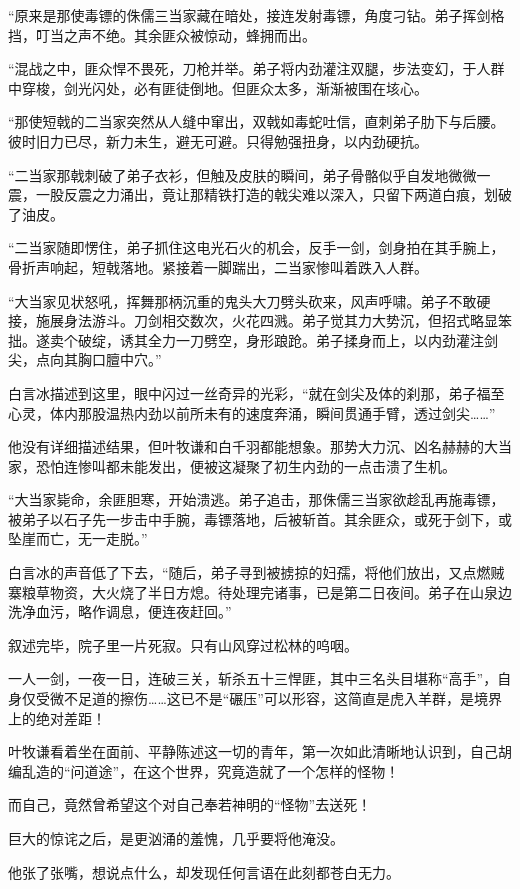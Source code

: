 “原来是那使毒镖的侏儒三当家藏在暗处，接连发射毒镖，角度刁钻。弟子挥剑格挡，叮当之声不绝。其余匪众被惊动，蜂拥而出。

“混战之中，匪众悍不畏死，刀枪并举。弟子将内劲灌注双腿，步法变幻，于人群中穿梭，剑光闪处，必有匪徒倒地。但匪众太多，渐渐被围在垓心。

“那使短戟的二当家突然从人缝中窜出，双戟如毒蛇吐信，直刺弟子肋下与后腰。彼时旧力已尽，新力未生，避无可避。只得勉强扭身，以内劲硬抗。

“二当家那戟刺破了弟子衣衫，但触及皮肤的瞬间，弟子骨骼似乎自发地微微一震，一股反震之力涌出，竟让那精铁打造的戟尖难以深入，只留下两道白痕，划破了油皮。

“二当家随即愣住，弟子抓住这电光石火的机会，反手一剑，剑身拍在其手腕上，骨折声响起，短戟落地。紧接着一脚踹出，二当家惨叫着跌入人群。

“大当家见状怒吼，挥舞那柄沉重的鬼头大刀劈头砍来，风声呼啸。弟子不敢硬接，施展身法游斗。刀剑相交数次，火花四溅。弟子觉其力大势沉，但招式略显笨拙。遂卖个破绽，诱其全力一刀劈空，身形踉跄。弟子揉身而上，以内劲灌注剑尖，点向其胸口膻中穴。”

白言冰描述到这里，眼中闪过一丝奇异的光彩，“就在剑尖及体的刹那，弟子福至心灵，体内那股温热内劲以前所未有的速度奔涌，瞬间贯通手臂，透过剑尖……”

他没有详细描述结果，但叶牧谦和白千羽都能想象。那势大力沉、凶名赫赫的大当家，恐怕连惨叫都未能发出，便被这凝聚了初生内劲的一点击溃了生机。

“大当家毙命，余匪胆寒，开始溃逃。弟子追击，那侏儒三当家欲趁乱再施毒镖，被弟子以石子先一步击中手腕，毒镖落地，后被斩首。其余匪众，或死于剑下，或坠崖而亡，无一走脱。”

白言冰的声音低了下去，“随后，弟子寻到被掳掠的妇孺，将他们放出，又点燃贼寨粮草物资，大火烧了半日方熄。待处理完诸事，已是第二日夜间。弟子在山泉边洗净血污，略作调息，便连夜赶回。”

叙述完毕，院子里一片死寂。只有山风穿过松林的呜咽。

一人一剑，一夜一日，连破三关，斩杀五十三悍匪，其中三名头目堪称“高手”，自身仅受微不足道的擦伤……这已不是“碾压”可以形容，这简直是虎入羊群，是境界上的绝对差距！

叶牧谦看着坐在面前、平静陈述这一切的青年，第一次如此清晰地认识到，自己胡编乱造的“问道途”，在这个世界，究竟造就了一个怎样的怪物！

而自己，竟然曾希望这个对自己奉若神明的“怪物”去送死！

巨大的惊诧之后，是更汹涌的羞愧，几乎要将他淹没。

他张了张嘴，想说点什么，却发现任何言语在此刻都苍白无力。


